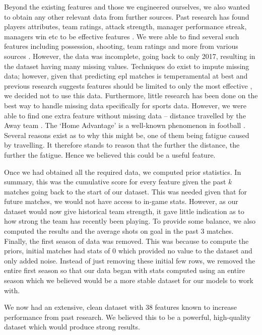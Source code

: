 \documentclass{article}
\begin{document}
Beyond the existing features and those we engineered ourselves, we also wanted to obtain any other relevant data from further sources. Past research has found players attributes, team ratings, attack strength, manager performance streak, managers win etc to be effective features \cite{fialho2019predicting, bunker2019machine}. We were able to find several such features including possession, shooting, team ratings and more from various sources \cite{fbref,whoscored}. However, the data was incomplete, going back to only 2017, resulting in the dataset having many missing values. Techniques do exist to impute missing data; however, given that predicting \gls{epl} matches is temperamental at best and previous research suggests features should be limited to only the most effective \cite{horvat2020use}, we decided not to use this data. Furthermore, little research has been done on the best way to handle missing data specifically for sports data. However, we were able to find one extra feature without missing data – distance travelled by the Away team \cite{Kampscshmidtrepo}. The ‘Home Advantage’ is a well-known phenomenon in football \cite{horvat2020use}. Several reasons exist as to why this might be, one of them being fatigue caused by travelling. It therefore stands to reason that the further the distance, the further the fatigue. Hence we believed this could be a useful feature.

Once we had obtained all the required data, we computed prior statistics. In summary, this was the cumulative score for every feature given the past $k$ matches going back to the start of our dataset. This was needed given that for future matches, we would not have access to in-game stats. However, as our dataset would now give historical team strength, it gave little indication as to how strong the team has recently been playing. To provide some balance, we also computed the results and the average shots on goal in the past 3 matches. Finally, the first season of data was removed. This was because to compute the priors, initial matches had stats of 0 which provided no value to the dataset and only added noise. Instead of just removing these initial few rows, we removed the entire first season so that our data began with stats computed using an entire season which we believed would be a more stable dataset for our models to work with. 

We now had an extensive, clean dataset with 38 features known to increase performance from past research. We believed this to be a powerful, high-quality dataset which would produce strong results. 
\end{document}
